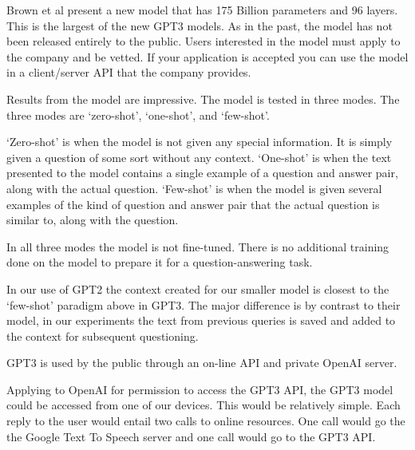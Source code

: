 Brown et al \cite{brown2020language} present a new model that has 175 Billion parameters and 96 layers. This is the largest of the new GPT3 models. As in the past, the model has not been released entirely to the public. Users interested in the model must apply to the company and be vetted. If your application is accepted you can use the model in a client/server API that the company provides.

Results from the model are impressive. The model is tested in three modes. The three modes are `zero-shot', `one-shot', and `few-shot'. 

`Zero-shot' is when the model is not given any special information. It is simply given a question of some sort without any context. `One-shot' is when the text presented to the model contains a single example of a question and answer pair, along with the actual question. `Few-shot' is when the model is given several examples of the kind of question and answer pair that the actual question is similar to, along with the question.

In all three modes the model is not fine-tuned. There is no additional training done on the model to prepare it for a question-answering task.

In our use of GPT2 the context created for our smaller model is closest to the `few-shot' paradigm above in GPT3. The major difference is by contrast to their model, in our experiments the text from previous queries is saved and added to the context for subsequent questioning.

GPT3 is used by the public through an on-line API and private OpenAI server.

Applying to OpenAI for permission to access the GPT3 API, the GPT3 model could be accessed from one of our devices. This would be relatively simple. Each reply to the user would entail two calls to online resources. One call would go the the Google Text To Speech server and one call would go to the GPT3 API.